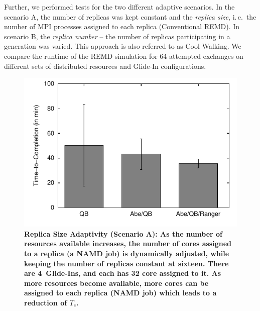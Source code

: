 \documentclass{rspublic}
\begin{document}
Further, we performed tests for the two different adaptive scenarios.  
In the scenario A, the number of replicas was kept constant and 
the \emph{replica size}, i.\,e.\ the number of MPI processes assigned
to each replica (Conventional REMD). 
In scenario B, the \emph{replica number} -- the number of replicas participating in a
generation was varied. This approach is also referred to as Cool Walking. 
We compare the runtime of the REMD simulation for 64 attempted exchanges 
on different sets of distributed resources and Glide-In configurations.
                    
\begin{figure}[h]
  \begin{minipage}[t]{.48\textwidth}
    \begin{center}  
      \includegraphics[width=\textwidth]{performance/perf_distributed_size_replica.pdf}
      \caption{\footnotesize \bf Replica Size Adaptivity (Scenario A):
        As the number of resources available increases, the number of
        cores assigned to a replica (a NAMD job) is dynamically
        adjusted, while keeping the number of replicas constant at
        sixteen.  There are 4~Glide-Ins, and each has 32 core assigned
        to it.  As more resources become available, more cores can be
        assigned to each replica (NAMD job) which leads to a reduction
        of $T_{c}$.  }
      \label{fig:performance_perf_distributed_A}
    \end{center}
  \end{minipage}
  \hfill
  \begin{minipage}[t]{.485\textwidth}
    \begin{center}  
     

\end{center}
\end{minipage}
\end{figure}
\end{document}

